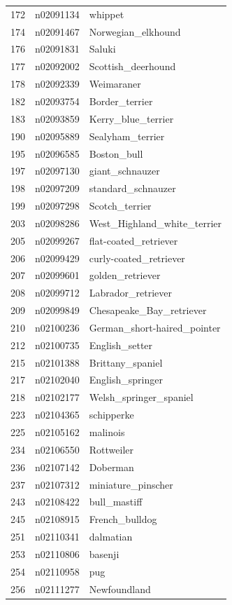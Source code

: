 \begin{table}
\begin{tabular}{cll}
172 & n02091134 & whippet \\
174 & n02091467 & Norwegian_elkhound \\
176 & n02091831 & Saluki \\
177 & n02092002 & Scottish_deerhound \\
178 & n02092339 & Weimaraner \\
182 & n02093754 & Border_terrier \\
183 & n02093859 & Kerry_blue_terrier \\
190 & n02095889 & Sealyham_terrier \\
195 & n02096585 & Boston_bull \\
197 & n02097130 & giant_schnauzer \\
198 & n02097209 & standard_schnauzer \\
199 & n02097298 & Scotch_terrier \\
203 & n02098286 & West_Highland_white_terrier \\
205 & n02099267 & flat-coated_retriever \\
206 & n02099429 & curly-coated_retriever \\
207 & n02099601 & golden_retriever \\
208 & n02099712 & Labrador_retriever \\
209 & n02099849 & Chesapeake_Bay_retriever \\
210 & n02100236 & German_short-haired_pointer \\
212 & n02100735 & English_setter \\
215 & n02101388 & Brittany_spaniel \\
217 & n02102040 & English_springer \\
218 & n02102177 & Welsh_springer_spaniel \\
223 & n02104365 & schipperke \\
225 & n02105162 & malinois \\
234 & n02106550 & Rottweiler \\
236 & n02107142 & Doberman \\
237 & n02107312 & miniature_pinscher \\
243 & n02108422 & bull_mastiff \\
245 & n02108915 & French_bulldog \\
251 & n02110341 & dalmatian \\
253 & n02110806 & basenji \\
254 & n02110958 & pug \\
256 & n02111277 & Newfoundland \\

\end{tabular}
\end{table}
